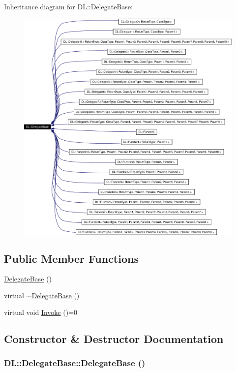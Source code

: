 Inheritance diagram for DL::Delegate\-Base:\begin{figure}[H]
\begin{center}
\leavevmode
\includegraphics[width=392pt]{classDL_1_1DelegateBase__inherit__graph}
\end{center}
\end{figure}
\subsection*{Public Member Functions}
\begin{CompactItemize}
\item 
\hyperlink{classDL_1_1DelegateBase_a0}{Delegate\-Base} ()
\item 
virtual \hyperlink{classDL_1_1DelegateBase_a1}{$\sim$Delegate\-Base} ()
\item 
virtual void \hyperlink{classDL_1_1DelegateBase_a2}{Invoke} ()=0
\end{CompactItemize}


\subsection{Constructor \& Destructor Documentation}
\hypertarget{classDL_1_1DelegateBase_a0}{
\subsubsection[DelegateBase]{\setlength{\rightskip}{0pt plus 5cm}DL::Delegate\-Base::Delegate\-Base ()}}
\label{classDL_1_1DelegateBase_a0}




